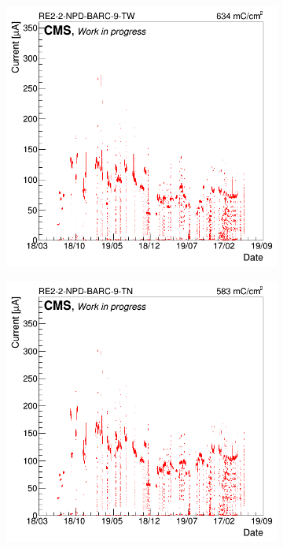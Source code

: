 	\begin{figure}[H]
    	\begin{subfigure}{0.5\linewidth}
			\centering
    		\includegraphics[width = \linewidth]{fig/chapt5/GIFpp-Longevity-monitoring-TW.png}
        	\caption{\label{fig:Longevity:A}}
    	\end{subfigure}
    	\begin{subfigure}{0.5\linewidth}
			\centering
    		\includegraphics[width = \linewidth]{fig/chapt5/GIFpp-Longevity-monitoring-TN.png}

\end{subfigure}
\end{figure}
